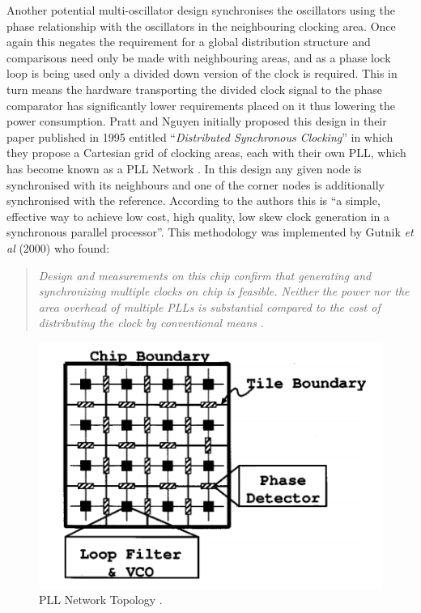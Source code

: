 \documentclass[11pt,english,british]{report}
\begin{document}
Another potential multi-oscillator design synchronises the oscillators using the phase relationship with the oscillators in the neighbouring clocking area. Once again this negates the requirement for a global distribution structure and comparisons need only be made with neighbouring areas, and as a phase lock loop is being used only a divided down version of the clock is required. This in turn means the hardware transporting the divided clock signal to the phase comparator has significantly lower requirements placed on it thus lowering the power consumption. Pratt and Nguyen initially proposed this design in their paper published in 1995 entitled ``\textit{Distributed Synchronous Clocking}'' in which they propose a Cartesian grid of clocking areas, each with their own PLL, which has become known as a PLL Network \cite{pratt1995distributed}. In this design any given node is synchronised with its neighbours and one of the corner nodes is additionally synchronised with the reference. According to the authors this is ``a simple, effective way to achieve low cost, high quality, low skew clock generation in a synchronous parallel processor''. This methodology was implemented by Gutnik \textit{et al} (2000) who found:
\begin{quote}
	\singlespacing
	\textit{Design and measurements on this chip confirm that generating and synchronizing multiple clocks on chip is feasible. Neither the power nor the area overhead of multiple PLLs is substantial compared to the cost of distributing the clock by conventional means} \cite{gutnik2000active}.
	\doublespacing
\end{quote}
\begin{figure}[h]
	\centering
	\includegraphics[scale=0.5]{../gutnik2000active}
	\caption{PLL Network Topology \cite{gutnik2000active}.}
	\label{fig:gutnik2000active}
\end{figure}
\end{document}
